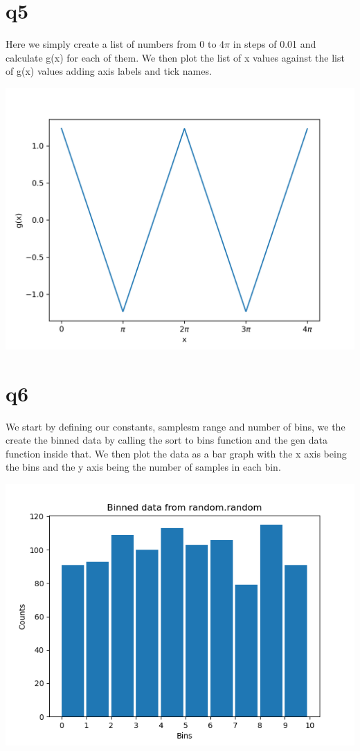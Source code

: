 \documentclass[a4paper,english]{article}
\begin{document}
    \section{q5}
    
    Here we simply create a list of numbers from 0 to $4\pi$ in steps of 0.01 and calculate g(x) for each of them.
    We then plot the list of x values against the list of g(x) values adding axis labels and tick names.
    \begin{center}
        \includegraphics[scale=0.8]{./1_5.png}
    \end{center}
    \section{q6}
    
    We start by defining our constants, samplesm range and number of bins, we the create the binned data by calling the sort to bins function and the gen data function inside that.
    We then plot the data as a bar graph with the x axis being the bins and the y axis being the number of samples in each bin.
    \begin{center}
        \includegraphics[scale=0.8]{./1_6.png}
    \end{center}
\end{document}
